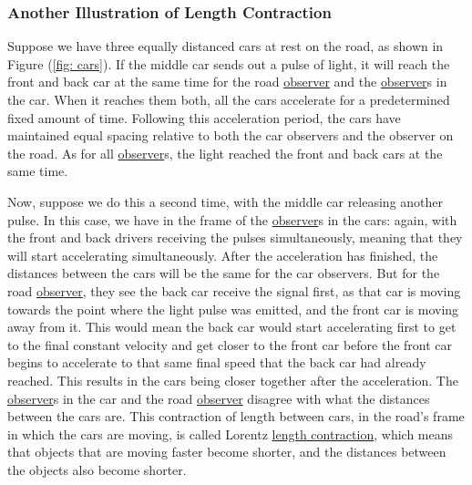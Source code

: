\subsubsection{Another Illustration of Length Contraction}

Suppose we have three equally distanced cars at rest on the road, as shown in Figure (\ref{fig: cars}).
If the middle car sends out a pulse of light, it will reach the front and back car at the same time for the road \hyperlink{def-observer}{observer} and the \hyperlink{def-observer}{observer}s in the car. When it reaches them both, all the cars accelerate for a predetermined fixed amount of time.
Following this acceleration period, the cars have maintained equal spacing relative to both the car observers and the observer on the road.
As for all \hyperlink{def-observer}{observer}s, the light reached the front and back cars at the same time.

Now, suppose we do this a second time, with the middle car releasing another pulse.
In this case, we have in the frame of the \hyperlink{def-observer}{observer}s in the cars: again, with the front and back drivers receiving the pulses simultaneously, meaning that they will start accelerating simultaneously.
After the acceleration has finished, the distances between the cars will be the same for the car observers.
But for the road \hyperlink{def-observer}{observer}, they see the back car receive the signal first, as that car is moving towards the point where the light pulse was emitted, and the front car is moving away from it.
This would mean the back car would start accelerating first to get to the final constant velocity and get closer to the front car before the front car begins to accelerate to that same final speed that the back car had already reached.
This results in the cars being closer together after the acceleration.
The \hyperlink{def-observer}{observer}s in the car and the road \hyperlink{def-observer}{observer} disagree with what the distances between the cars are.
This contraction of length between cars, in the road's frame in which the cars are moving, is called Lorentz \hyperlink{def-length-contraction}{length contraction}, which means that objects that are moving faster become shorter, and the distances between the objects also become shorter.

